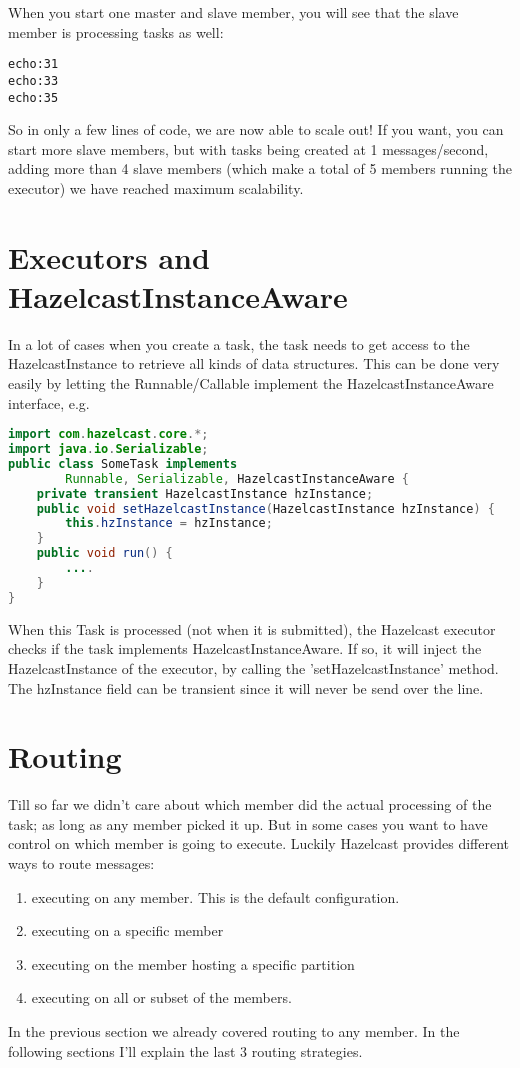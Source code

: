 When you start one master and slave member, you will see that the slave member is processing tasks as well:
\begin{lstlisting}
echo:31
echo:33
echo:35	
\end{lstlisting}
So in only a few lines of code, we are now able to scale out! If you want, you can start more slave members, but with tasks being created at 1 messages/second, adding more than 4 slave members (which make a total of 5 members running the executor) we have reached maximum scalability. 

\section{Executors and HazelcastInstanceAware}
In a lot of cases when you create a task, the task needs to get access to the HazelcastInstance to retrieve all kinds of data structures. This can be done very easily by letting the Runnable/Callable implement the HazelcastInstanceAware interface, e.g.

\begin{lstlisting}[language=java]
import com.hazelcast.core.*;
import java.io.Serializable;
public class SomeTask implements
        Runnable, Serializable, HazelcastInstanceAware {
    private transient HazelcastInstance hzInstance;
    public void setHazelcastInstance(HazelcastInstance hzInstance) {
        this.hzInstance = hzInstance;
    }
    public void run() {
        ....
    }
}
\end{lstlisting}
When this Task is processed (not when it is submitted), the Hazelcast executor checks if the task implements HazelcastInstanceAware. If so, it will inject the HazelcastInstance of the executor, by calling the 'setHazelcastInstance' method. The hzInstance field can be transient since it will never be send over the line. 


\section{Routing}
Till so far we didn't care about which member did the actual processing of the task; as long as any member picked it up. But in some cases you want to have control on which member is going to execute. Luckily Hazelcast provides different ways to route messages:
\begin{enumerate}
\item executing on any member. This is the default configuration.
\item executing on a specific member
\item executing on the member hosting a specific partition
\item executing on all or subset of the members.
\end{enumerate}
In the previous section we already covered routing to any member. In the following sections I'll explain the last 3 routing strategies.

